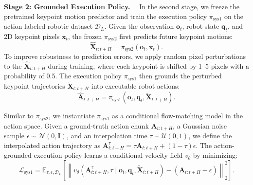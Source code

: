 \textbf{Stage 2: Grounded Execution Policy.}~~
In the second stage, we freeze the pretrained keypoint motion predictor and train the execution policy $\pi_{\mathrm{sys1}}$ on the action-labeled robotic dataset $\mathcal{D}_{L}$. 
Given the observation $\mathbf{o}_t$, robot state $\mathbf{q}_t$, and 2D keypoint pixels $\mathbf{x}_t$, the frozen $\pi_{\mathrm{sys2}}$ first predicts future keypoint motions:
\begin{equation}
    \hat{\mathbf{X}}_{t:t+H}
    =
    \pi_{\mathrm{sys2}}(\mathbf{o}_t, \mathbf{x}_t).
\end{equation}
To improve robustness to prediction errors, we apply random pixel perturbations to the $\hat{\mathbf{X}}_{t:t+H}$ during training, where each keypoint is shifted by 1--5 pixels with a probability of 0.5. The execution policy $\pi_{\mathrm{sys1}}$ then grounds the perturbed keypoint trajectories $\tilde{\mathbf{X}}_{t:t+H}$ into executable robot actions:
\begin{equation}
    \hat{\mathbf{A}}_{t:t+H}
    =
    \pi_{\mathrm{sys1}}(\mathbf{o}_t, \mathbf{q}_t, \tilde{\mathbf{X}}_{t:t+H}).
\end{equation}



Similar to $\pi_{\mathrm{sys2}}$, we instantiate $\pi_{\mathrm{sys1}}$ as a conditional flow-matching model in the action space.
Given a ground-truth action chunk $\mathbf{A}_{t:t+H}$, a Gaussian noise sample $\epsilon\sim\mathcal{N}(0,\mathbf{I})$, and an interpolation time $\tau\sim\mathcal{U}(0,1)$, we define the interpolated action trajectory as
$
    \mathbf{A}_{t:t+H}^{\tau}
    =
    \tau \mathbf{A}_{t:t+H} + (1-\tau)\epsilon
$.
The action-grounded execution policy learns a conditional velocity field $v_{\theta}$ by minimizing:
\begin{equation}
    \mathcal{L}_{\mathrm{sys1}}
    =
    \mathbb{E}_{\tau,\epsilon,\mathcal{D}_{L}}
    \left[
    \left\|
    v_{\theta}
    \left(
    \mathbf{A}_{t:t+H}^{\tau}, \tau
    \mid
    \mathbf{o}_t, \mathbf{q}_t, \mathbf{\tilde{X}}_{t:t+H}
    \right)
    -
    \left(
    \mathbf{A}_{t:t+H}-\epsilon
    \right)
    \right\|_2^2
    \right].
    \label{eq:sys1_flow_matching}
\end{equation}
